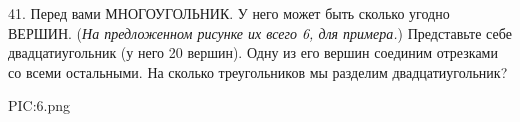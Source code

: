 41. Перед вами МНОГОУГОЛЬНИК. У него может быть сколько угодно ВЕРШИН. ({\it На предложенном рисунке их всего 6, для примера.}) Представьте себе двадцатиугольник (у него 20 вершин). Одну из его вершин соединим отрезками со всеми остальными. На сколько треугольников мы разделим двадцатиугольник?
\begin{center}
{{PIC:6.png}}
\end{center}
